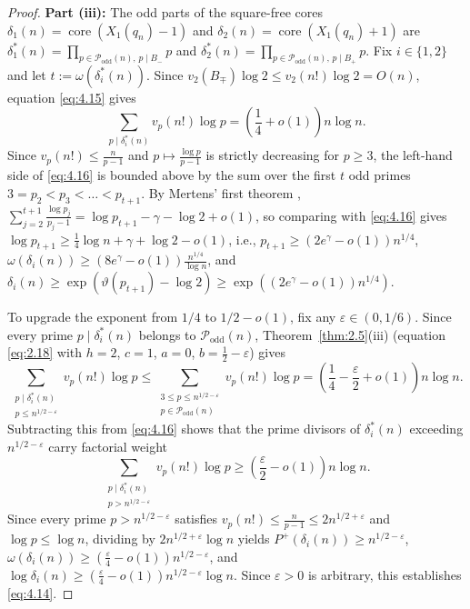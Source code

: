 \documentclass[11pt,reqno]{amsart}
\theoremstyle{remark}
\numberwithin{equation}{section}
\newcommand{\Podd}{\mathcal{P}_{\mathrm{odd}}}
\DeclareMathOperator{\core}{core}
\begin{document}
\begin{proof}
\textbf{Part (iii):} The odd parts of the square-free cores $\delta_1(n) = \core(X_1(q_n) - 1)$ and $\delta_2(n) = \core(X_1(q_n) + 1)$ are $\delta_1^*(n) = \prod_{p \in \Podd(n),\, p \mid B_-} p$ and $\delta_2^*(n) = \prod_{p \in \Podd(n),\, p \mid B_+} p$. Fix $i \in \{1, 2\}$ and let $t := \omega(\delta_i^*(n))$. Since $v_2(B_\mp)\log 2 \le v_2(n!)\log 2 = O(n)$, equation \eqref{eq:4.15} gives
\begin{equation}\label{eq:4.16}
\sum_{p \mid \delta_i^*(n)} v_p(n!)\log p = \left(\frac{1}{4} + o(1)\right)n\log n.
\end{equation}
Since $v_p(n!) \le \frac{n}{p-1}$ and $p \mapsto \frac{\log p}{p-1}$ is strictly decreasing for $p \ge 3$, the left-hand side of \eqref{eq:4.16} is bounded above by the sum over the first $t$ odd primes $3 = p_2 < p_3 < \dots < p_{t+1}$. By Mertens' first theorem \cite[Chapter~7]{Davenport2000}, $\sum_{j=2}^{t+1} \frac{\log p_j}{p_j-1} = \log p_{t+1} - \gamma - \log 2 + o(1)$, so comparing with \eqref{eq:4.16} gives $\log p_{t+1} \ge \frac{1}{4}\log n + \gamma + \log 2 - o(1)$, i.e., $p_{t+1} \ge (2e^\gamma - o(1))n^{1/4}$, $\omega(\delta_i(n)) \ge (8e^\gamma - o(1))\frac{n^{1/4}}{\log n}$, and $\delta_i(n) \ge \exp(\vartheta(p_{t+1}) - \log 2) \ge \exp((2e^\gamma - o(1))n^{1/4})$.

To upgrade the exponent from $1/4$ to $1/2 - o(1)$, fix any $\varepsilon \in (0, 1/6)$. Since every prime $p \mid \delta_i^*(n)$ belongs to $\Podd(n)$, Theorem~\ref{thm:2.5}(iii) (equation \eqref{eq:2.18} with $h = 2$, $c = 1$, $a = 0$, $b = \frac{1}{2} - \varepsilon$) gives
\[
\sum_{\substack{p \mid \delta_i^*(n) \\ p \le n^{1/2-\varepsilon}}} v_p(n!)\log p \le \sum_{\substack{3 \le p \le n^{1/2-\varepsilon} \\ p \in \Podd(n)}} v_p(n!)\log p = \left(\frac{1}{4} - \frac{\varepsilon}{2} + o(1)\right)n\log n.
\]
Subtracting this from \eqref{eq:4.16} shows that the prime divisors of $\delta_i^*(n)$ exceeding $n^{1/2-\varepsilon}$ carry factorial weight
\[
\sum_{\substack{p \mid \delta_i^*(n) \\ p > n^{1/2-\varepsilon}}} v_p(n!)\log p \ge \left(\frac{\varepsilon}{2} - o(1)\right)n\log n.
\]
Since every prime $p > n^{1/2-\varepsilon}$ satisfies $v_p(n!) \le \frac{n}{p-1} \le 2n^{1/2+\varepsilon}$ and $\log p \le \log n$, dividing by $2n^{1/2+\varepsilon}\log n$ yields $P^+(\delta_i(n)) \ge n^{1/2-\varepsilon}$, $\omega(\delta_i(n)) \ge (\frac{\varepsilon}{4} - o(1))n^{1/2-\varepsilon}$, and $\log \delta_i(n) \ge (\frac{\varepsilon}{4} - o(1))n^{1/2-\varepsilon}\log n$. Since $\varepsilon > 0$ is arbitrary, this establishes \eqref{eq:4.14}.
\end{proof}
\end{document}
